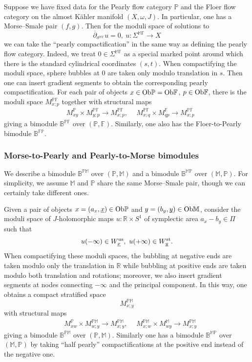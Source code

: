 \documentclass[reqno, 10pt]{amsart}
\numberwithin{equation}{section}
\numberwithin{equation}{section}
\theoremstyle{definition}
\theoremstyle{remark}
\newcommand{\beqn}{\begin{equation*}}
\newcommand{\eeqn}{\end{equation*}}
\newcommand{\ov}{\overline}
\newcommand{\mb}{\mathbb}
\newcommand{\uds}[1]{\underline{\smash{#1}}}
\begin{document}
Suppose we have fixed data for the Pearly flow category ${\mb P}$ and the Floer flow category on the almost K\"ahler manifold $(X, \omega, J)$. In particular, one has a Morse--Smale pair $(f, g)$. Then for the moduli space of solutions to 
\beqn
\ov\partial_{\sigma^{\mb{MF}}} u = 0,\ u: \Sigma^{\mb{MF}} \to X
\eeqn
we can take the ``pearly compactification'' in the same way as defining the pearly flow category. Indeed, we treat $0 \in \Sigma^{\mb{MF}}$ as a special marked point around which there is the standard cylindrical coordinates $(s, t)$. When compactifying the moduli space, sphere bubbles at $0$ are taken only modulo translation in $s$. Then one can insert gradient segments to obtain the corresponding pearly compactification. For each pair of objects $x \in {\rm Ob}{\mb P} = {\rm Ob}{\mb F}$, $p \in {\rm Ob}{\mb F}$, there is the moduli space $M_{x;p}^{\mb{PF}}$ together with structural maps
\begin{align*}
&\ M_{xy}^{\mb{P}}\times M_{y;p}^{\mb{PF}} \to M_{x;p}^{\mb{PF}},\ &\ M_{x; q}^{\mb{PF}} \times M_{qp}^{\mb{F}} \to M_{x;p}^{\mb{PF}}
\end{align*}
giving a bimodule ${\mb B}^{\mb{PF}}$ over $({\mb P}, {\mb F})$. Similarly, one also has the Floer-to-Pearly bimodule ${\mb B}^{\mb{FP}}$. 





\subsubsection{Morse-to-Pearly and Pearly-to-Morse bimodules}

We describe a bimodule $\mb{B}^{\mb{PM}}$ over $({\mb P}, {\mb M})$ and a bimodule ${\mb{B}}^{\mb{MP}}$ over $({\mb M}, {\mb P})$. For simplicity, we assume ${\mb M}$ and ${\mb P}$ share the same Morse--Smale pair, though we can certainly take different ones. 

Given a pair of objects $x = (a_x, \uds x) \in {\rm Ob}{\mb P}$ and $y = (b_y, \uds y) \in {\rm Ob}{\mb M}$, consider the moduli space of $J$-holomorphic maps $u: {\mb R}\times S^1$ of symplectic area $a_x - b_y \in \Pi$ such that 
\beqn
u(-\infty) \in W_{\uds x}^{\rm us},\ u(+\infty) \in W_{\uds y}^{\rm st}.
\eeqn
When compactifying these moduli spaces, the bubbling at negative ends are taken modulo only the translation in ${\mb R}$ while bubbling at positive ends are taken modulo both translation and rotations; moreover, we also insert gradient segments at nodes connecting $-\infty$ and the principal component. In this way, one obtains a compact stratified space
\beqn
M_{x;y}^{\mb{PM}}
\eeqn
with structural maps
\begin{align*}
&\ M_{xw}^{\mb{P}} \times M_{w; y}^{\mb{PM}}\to M_{x;y}^{\mb{PM}},\ &\ M_{x; w}^{\mb{PM}}\times M_{wy}^{\mb{M}} \to M_{x;y}^{\mb{PM}}
\end{align*}
giving a bimodule ${\mb B}^{\mb{PM}}$ over $({\mb P}, {\mb M})$. Similarly one has a bimodule ${\mb B}^{\mb{MP}}$ over $({\mb M}, {\mb P})$ by taking ``half pearly'' compactifications at the positive end instead of the negative one.
\end{document}
